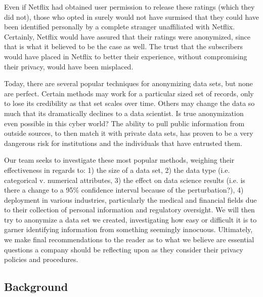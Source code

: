 \documentclass[10pt,journal,compsoc]{IEEEtran}
\begin{document}
Even if Netflix had obtained user permission to release these ratings (which they did not), those who opted in surely would not have surmised that they could have been identified personally by a complete stranger unaffiliated with Netflix.  Certainly, Netflix would have assured that their ratings were anonymized, since that is what it believed to be the case as well. The trust that the subscribers would have placed in Netflix to better their experience, without compromising their privacy, would have been misplaced.
	
Today, there are several popular techniques for anonymizing data sets, but none are perfect.  Certain methods may work for a particular sized set of records, only to lose its credibility as that set scales over time.  Others may change the data so much that its dramatically declines to a data scientist. Is true anonymization even possible in this cyber world? The ability to pull public information from outside sources, to then match it with private data sets, has proven to be a very dangerous risk for institutions and the individuals that have entrusted them.
	
Our team seeks to investigate these most popular methods, weighing their effectiveness in regards to: 1) the size of a data set, 
2)	the data type (i.e. categorical v. numerical attributes,
3)	the effect on data science results (i.e. is there a change to a 95\% confidence interval because of the perturbation?),
4)	deployment in various industries, particularly the medical and financial fields due to their collection of personal information and regulatory oversight.  We will then try to anonymize a data set we created, investigating how easy or difficult it is to garner identifying information from something seemingly innocuous.  Ultimately, we make final recommendations to the reader as to what we believe are essential questions a company should be reflecting upon as they consider their privacy policies and procedures.



\hfill 
 
\hfill 

\subsection{Background}

\end{document}
